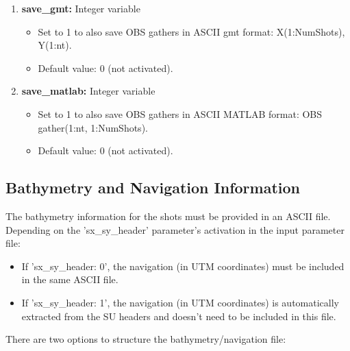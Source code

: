 \documentclass[11pt, oneside]{article}   	%
\begin{document}
\begin{enumerate}
\item \textbf{save\_gmt:} Integer variable
\begin{itemize}
\item Set to 1 to also save OBS gathers in ASCII gmt format: X(1:NumShots), Y(1:nt).
\item Default value: 0 (not activated).
\end{itemize}

\item \textbf{save\_matlab:} Integer variable
\begin{itemize}
\item Set to 1 to also save OBS gathers in ASCII MATLAB format: OBS gather(1:nt, 1:NumShots).
\item Default value: 0 (not activated).
\end{itemize}
\end{enumerate}

\subsection{Bathymetry and Navigation Information}\label{sec4b}

The bathymetry information for the shots must be provided in an ASCII file. Depending on the 'sx\_sy\_header' parameter's activation in the input parameter file:

\begin{itemize}
  \item If 'sx\_sy\_header: 0', the navigation (in UTM coordinates) must be included in the same ASCII file.
  \item If 'sx\_sy\_header: 1', the navigation (in UTM coordinates) is automatically extracted from the SU headers and doesn't need to be included in this file.
\end{itemize}

There are two options to structure the bathymetry/navigation file:
\end{document}
